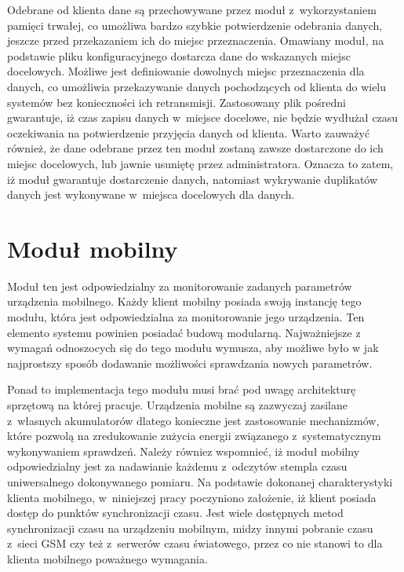 Odebrane od klienta dane są przechowywane przez moduł z~wykorzystaniem
pamięci trwałej, co umożliwa bardzo szybkie potwierdzenie odebrania
danych, jeszcze przed przekazaniem ich do miejsc
przeznaczenia. Omawiany moduł, na podstawie pliku konfiguracyjnego
dostarcza dane do wskazanych miejsc docelowych. Możliwe jest
definiowanie dowolnych miejsc przeznaczenia dla danych, co umożliwia
przekazywanie danych pochodzących od klienta do wielu systemów bez
konieczności ich retransmisji. Zastosowany plik pośredni gwarantuje,
iż czas zapisu danych w~miejsce docelowe, nie będzie wydłużał czasu
oczekiwania na potwierdzenie przyjęcia danych od klienta. Warto
zauważyć również, że dane odebrane przez ten moduł zostaną zawsze
dostarczone do ich miejsc docelowych, lub jawnie usuniętę przez
administratora. Oznacza to zatem, iż moduł gwarantuje dostarczenie
danych, natomiast wykrywanie duplikatów danych jest wykonywane
w~miejsca docelowych dla danych.


\section[Moduł mobilny][Moduł mobilny]{Moduł mobilny}

Moduł ten jest odpowiedzialny za monitorowanie zadanych parametrów
urządzenia mobilnego. Każdy klient mobilny posiada swoją instancję
tego modułu, która jest odpowiedzialna za monitorowanie jego
urządzenia. Ten elemento systemu powinien posiadać budową
modularną. Najważniejsze z wymagań odnoszocych się do tego modułu
wymusza, aby możliwe było w jak najprostszy sposób dodawanie
możliwości sprawdzania nowych parametrów.  

Ponad to implementacja tego modułu musi brać pod uwagę architekturę
sprzętową na której pracuje. Urządzenia mobilne są zazwyczaj zasilane
z~własnych akumulatorów dlatego konieczne jest zastosowanie
mechanizmów, które pozwolą na zredukowanie zużycia energii związanego
z~systematycznym wykonywaniem sprawdzeń. Należy równiez wspomnieć, iż
moduł mobilny odpowiedzialny jest za nadawianie każdemu z~odczytów
stempla czasu uniwersalnego dokonywanego pomiaru. Na podstawie
dokonanej charakterystyki klienta mobilnego, w~niniejszej pracy
poczyniono założenie, iż klient posiada dostęp do punktów
synchronizacji czasu. Jest wiele dostępnych metod synchronizacji czasu
na urządzeniu mobilnym, midzy innymi pobranie czasu z~sieci GSM czy
też z~serwerów czasu światowego, przez co nie stanowi to dla klienta
mobilnego poważnego wymagania.

